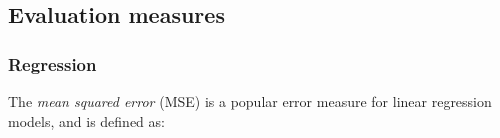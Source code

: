 





\subsection{Evaluation measures}

\subsubsection{Regression}\label{sec:eval_regression}
The \emph{mean squared error} (MSE) is a popular error measure for linear regression models, and is defined as: 

